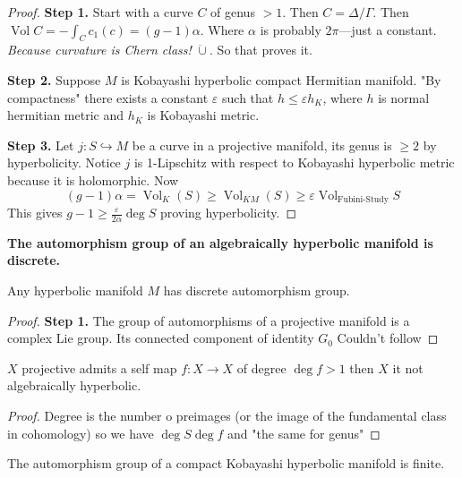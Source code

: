 \begin{proof}
\medskip\noindent
{\bf Step 1.}
Start with a curve $C$ of genus $>1$. Then
$C=\Delta/\Gamma$. Then $\operatorname{Vol}
C=-\int_{C}c_1(c)=(g-1)\alpha$. Where
$\alpha$ is probably $2\pi$---just a
constant. {\it Because curvature is Chern
class!} $\ddot\cup$. So that proves it.

\medskip\noindent
{\bf Step 2.}
Suppose $M$ is Kobayashi hyperbolic compact
Hermitian manifold. "By compactness" there
exists a constant $\varepsilon$ such that $h
\leq \varepsilon h_K$, where $h$ is normal
hermitian metric and $h_K$ is Kobayashi
metric.

\medskip\noindent
{\bf Step 3.}
Let $j:S \hookrightarrow M$ be a curve in a
projective manifold, its genus is $\geq 2$ by
hyperbolicity. Notice $j$ is 1-Lipschitz with
respect to Kobayashi hyperbolic metric
because it is holomorphic. Now
$$
(g-1)\alpha=\operatorname{Vol}_{K}(S)\geq
\operatorname{Vol}_{KM}(S)\geq
\varepsilon
\operatorname{Vol}_{\text{Fubini-Study}}S
$$
This gives $g-1\geq \frac{\varepsilon}{2
\alpha}\operatorname{deg} S$ proving
hyperbolicity.
\end{proof}

\medskip\noindent
{\bf The automorphism group of an
algebraically hyperbolic manifold is
discrete.}

\begin{proposition}[Claim]
\label{proposition-ah-discrete-claim}
Any hyperbolic manifold $M$ has discrete
automorphism group.
\end{proposition}

\begin{proof}
\medskip\noindent
{\bf Step 1.}
The group of automorphisms of a projective
manifold is a complex Lie group. Its
connected component of identity $G_0$
Couldn't follow
\end{proof}

\begin{theorem}
\label{theorem-ah-self-map}
$X$ projective admits a self map $f:X \to X$
of degree $\operatorname{deg}f>1$ then $X$ it
not algebraically hyperbolic.
\end{theorem}

\begin{proof}
Degree is the number o preimages (or the
image of the fundamental class in cohomology)
so we have $\operatorname{deg} S
\operatorname{deg} f$ and "the same for
genus"
\end{proof}

\begin{proposition}[Claim]
\label{proposition-ah-finite-claim}
The automorphism group of a compact Kobayashi
hyperbolic manifold is finite.
\end{proposition}

